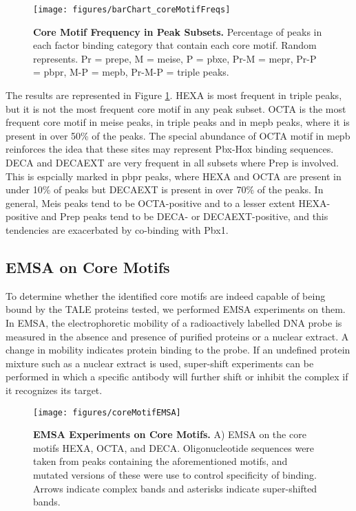 \begin{figure}[]
  \centering
  \texttt{[image: figures/barChart\_coreMotifFreqs]}
  \caption[Core Motif Frequency in Peak Subsets]{\textbf{Core Motif Frequency in Peak Subsets.} Percentage of peaks in each factor binding category that contain each core motif. Random represents. Pr = \ac{prepe}, M = \ac{meise}, P = \ac{pbxe}, Pr-M = \ac{mepr}, Pr-P = \ac{pbpr}, M-P = \ac{mepb}, Pr-M-P = triple peaks.}
  \label{fig:coreMotifFreqs}
\end{figure}

The results are represented in Figure \ref{fig:coreMotifFreqs}. \ac{HEXA} is most frequent in triple peaks, but it is not the most frequent core motif in any peak subset. \ac{OCTA} is the most frequent core motif in \ac{meise} peaks, in triple peaks and in \ac{mepb} peaks, where it is present in over 50\% of the peaks. The special abundance of OCTA motif in \ac{mepb} reinforces the idea that these sites may represent Pbx-Hox binding sequences.  \ac{DECA} and \ac{DECAEXT} are very frequent in all subsets where Prep is involved. This is espcially marked in \ac{pbpr} peaks, where \ac{HEXA} and \ac{OCTA} are present in under 10\% of peaks but  \ac{DECAEXT} is present in over 70\% of the peaks. In general, Meis peaks tend to be \ac{OCTA}-positive and to a lesser extent \ac{HEXA}-positive and Prep peaks tend to be \ac{DECA}- or \ac{DECAEXT}-positive, and this tendencies are exacerbated by co-binding with Pbx1. 

\subsection{EMSA on Core Motifs}

To determine whether the identified core motifs are indeed capable of being bound by the \ac{TALE} proteins tested, we performed \ac{EMSA} experiments on them. In \ac{EMSA}, the electrophoretic mobility of a radioactively labelled DNA probe is measured in the absence and presence of purified proteins or a nuclear extract. A change in mobility indicates protein binding to the probe. If an undefined protein mixture such as a nuclear extract is used, super-shift experiments can be performed in which a specific antibody will further shift or inhibit the complex if it recognizes its target.

\begin{figure}[]
  \centering
  \texttt{[image: figures/coreMotifEMSA]}
  \caption[EMSA Experiments on Core Motifs]{\textbf{EMSA Experiments on Core Motifs.} A) \ac{EMSA} on the core motifs \ac{HEXA}, \ac{OCTA}, and \ac{DECA}. Oligonucleotide sequences were taken from peaks containing the aforementioned motifs, and mutated versions of these were use to control specificity of binding. Arrows indicate complex bands and asterisks indicate super-shifted bands.}
  \label{fig:coreMotifEMSA}
\end{figure}

